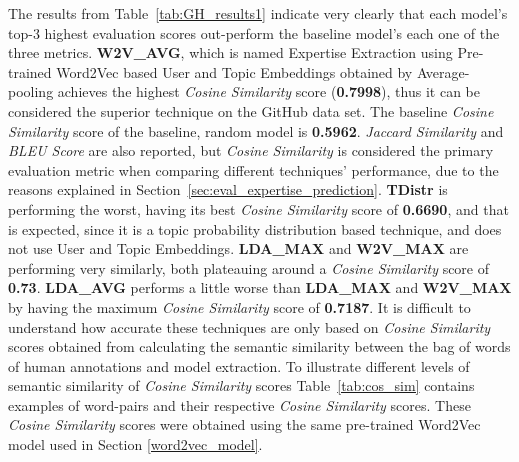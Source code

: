         The results from Table~\ref{tab:GH_results1} indicate very clearly that each model's top-$3$ highest evaluation scores out-perform the baseline model's each one of the three metrics. \textbf{W2V\_AVG}, which is named Expertise Extraction using Pre-trained Word2Vec based User and Topic Embeddings obtained by Average-pooling achieves the highest \emph{Cosine Similarity} score (\textbf{0.7998}), thus it can be considered the superior technique on the GitHub data set. The baseline \emph{Cosine Similarity} score of the baseline, random model is \textbf{0.5962}. \emph{Jaccard Similarity} and \emph{BLEU Score} are also reported, but \emph{Cosine Similarity} is considered the primary evaluation metric when comparing different techniques' performance, due to the reasons explained in Section~\ref{sec:eval_expertise_prediction}. \textbf{TDistr} is performing the worst, having its best \emph{Cosine Similarity} score of \textbf{0.6690}, and that is expected, since it is a topic probability distribution based technique, and does not use User and Topic Embeddings. \textbf{LDA\_MAX} and \textbf{W2V\_MAX} are performing very similarly, both plateauing around a \emph{Cosine Similarity} score of \textbf{0.73}. \textbf{LDA\_AVG} performs a little worse than  \textbf{LDA\_MAX} and \textbf{W2V\_MAX} by having the maximum \emph{Cosine Similarity} score of \textbf{0.7187}. It is difficult to understand how accurate these techniques are only based on \emph{Cosine Similarity} scores obtained from calculating the semantic similarity between the bag of words of human annotations and model extraction. To illustrate different levels of semantic similarity of \emph{Cosine Similarity} scores Table~\ref{tab:cos_sim} contains examples of word-pairs and their respective \emph{Cosine Similarity} scores. These \emph{Cosine Similarity} scores were obtained using the same pre-trained Word2Vec model\cite{efstathiou2018word} used in Section \ref{word2vec_model}. 
        
